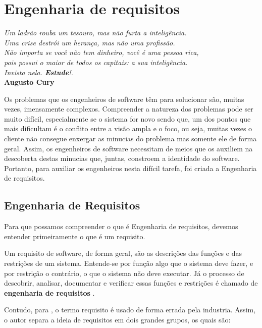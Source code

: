 \chapter{Engenharia de requisitos}\label{cap:cap2}

\begin{flushright}
	\textit{
		Um ladrão rouba um tesouro, mas não furta a inteligência. \\
		Uma crise destrói um herança, mas não uma profissão. \\ Não importa se você não tem dinheiro, você é uma pessoa rica, \\ pois possui o maior de todos os capitais: a sua inteligência. \\ Invista nela. \textbf{Estude}!.
	} \\
	
	\textbf{Augusto Cury}
\end{flushright}

Os problemas que os engenheiros de software têm para solucionar são, muitas vezes, imensamente complexos. Compreender a natureza dos problemas pode ser muito difícil, especialmente se o sistema for novo sendo que, um dos pontos que mais dificultam é o conflito entre a visão ampla e o foco, ou seja, muitas vezes o cliente não consegue enxergar as minucias do problema mas somente ele de forma geral. Assim, os engenheiros de software necessitam de meios que os auxiliem na descoberta destas minucias que, juntas, constroem a identidade do software. Portanto, para auxiliar os engenheiros nesta difícil tarefa, foi criada a Engenharia de requisitos. 

\section{Engenharia de Requisitos}

Para que possamos compreender o que é Engenharia de requisitos, devemos entender primeiramente o que é um requisito. 

Um requisito de software, de forma geral, são as  descrições das funções e das restrições de um sistema. Entende-se por função algo que o sistema deve fazer, e por restrição o contrário, o que o sistema não deve executar. Já o processo de descobrir, analisar, documentar e verificar essas funções e restrições é chamado de \textbf{engenharia de requisitos} \cite{sommerville2003engenharia}.

Contudo, para \cite{sommerville2003engenharia}, o termo requisito é usado de forma errada pela industria. Assim, o autor separa a ideia de requisitos em dois grandes  grupos, os quais são:

